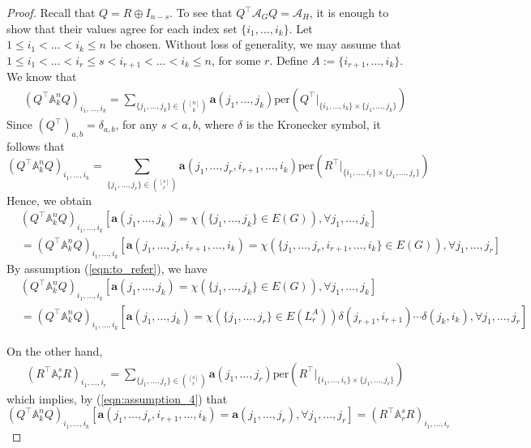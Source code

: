 \documentclass[10pt,a4paper]{amsart}
\newcommand{\ev}[1]{( #1 )}
\newcommand{\ew}[1]{\left( #1 \right)}
\begin{document}
\begin{proof}
Recall that $Q = R\oplus I_{n-s}$. To see that $Q^\top \mathcal{A}_G Q = \mathcal{A}_H$, it is enough to show that their values agree for each index set $\{i_1,\ldots,i_k\}$. Let $1\leq i_1 < \ldots < i_k \leq n$ be chosen. Without loss of generality, we may assume that $1\leq i_1 < \ldots < i_r \leq s < i_{r+1} < \ldots < i_k \leq n$, for some $r$. Define $A:= \{ i_{r+1}, \ldots, i_{k}\}$. We know that
\begin{align*}
& (Q^\top \mathbb{A}^n_k Q)_{ i_1,\ldots,i_k } = \sum_{ \{ j_1,\ldots,j_k\} \in \binom{ [n] }{k} } \mathbf{a}\ev{j_1,\ldots,j_k}\mathrm{per}\ew{ Q^{\top}\big\vert_{ \{ i_1,\ldots,i_k\} \times \{ j_1,\ldots,j_k \} } } 
\end{align*}
Since $(Q^{\top})_{ a,b } = \delta_{a,b}$, for any $s<a,b$, where $\delta$ is the Kronecker symbol, it follows that
\begin{equation}
\label{eqn:assumption_4}
(Q^\top \mathbb{A}^n_k Q)_{ i_1,\ldots,i_k } =  \sum_{ \{ j_1,\ldots,j_r\} \in \binom{ [s] }{r} } \mathbf{a}\ev{j_1,\ldots, j_r, i_{r+1},\ldots ,i_k}\mathrm{per}\ew{ R^{\top}\big\vert_{ \{ i_1,\ldots,i_r\} \times \{ j_1,\ldots,j_r \} } } 
\end{equation}
Hence, we obtain
\begin{align*}
&(Q^\top \mathbb{A}^n_k Q)_{ i_1,\ldots,i_k }[ \mathbf{a}\ev{j_1,\ldots,j_k} = \chi\ev{ \{ j_1, \ldots, j_k \} \in E\ev{G} }, \forall j_1,\ldots,j_k ] \\
& =(Q^\top \mathbb{A}^n_k Q)_{ i_1,\ldots,i_k }
[\mathbf{a}\ev{j_1,\ldots,j_r,i_{r+1},\ldots,i_k} = \chi\ev{ \{ j_1,\ldots,j_r,i_{r+1},\ldots,i_k \} \in E\ev{G} }, \forall j_1,\ldots,j_r]
\end{align*}
By assumption (\ref{eqn:to_refer}), we have
\begin{align*}
&(Q^\top \mathbb{A}^n_k Q)_{ i_1,\ldots,i_k }[ \mathbf{a}\ev{j_1,\ldots,j_k} = \chi\ev{ \{ j_1, \ldots, j_k \} \in E\ev{G} }, \forall j_1,\ldots,j_k ] \\
& = (Q^\top \mathbb{A}^n_k Q)_{ i_1,\ldots,i_k } [ \mathbf{a}\ev{j_1,\ldots, j_k} = \chi\ev{ \{ j_1, \ldots, j_r \} \in E\ev{L_r^A} } \delta\ev{j_{r+1},i_{r+1}} \cdots  \delta\ev{j_{k},i_{k}}, \forall j_1,\ldots,j_r  ] 
\end{align*}

On the other hand, 
\begin{align*}
& \ev{ R^\top \mathbb{A}^{s}_r R }_{i_1,\ldots,i_r} = \sum_{ \{ j_1,\ldots,j_r\} \in \binom{ [s] }{r} } \mathbf{a}\ev{j_1,\ldots, j_r}\mathrm{per}\ew{ R^\top\big\vert_{ \{ i_1,\ldots,i_r\} \times \{ j_1,\ldots,j_r \} } } 
\end{align*}
which implies, by (\ref{eqn:assumption_4}) that
\begin{equation}
\label{eqn:assumption_3}
(Q^\top \mathbb{A}^n_k Q)_{ i_1,\ldots,i_k } [ \mathbf{a}\ev{j_1,\ldots, j_r, i_{r+1},\ldots ,i_k} = \mathbf{a}\ev{j_1,\ldots, j_r}, \forall j_1,\ldots,j_r  ] = \ev{ R^\top \mathbb{A}^{s}_r R }_{i_1,\ldots,i_r}
\end{equation}


\end{proof}
\end{document}
